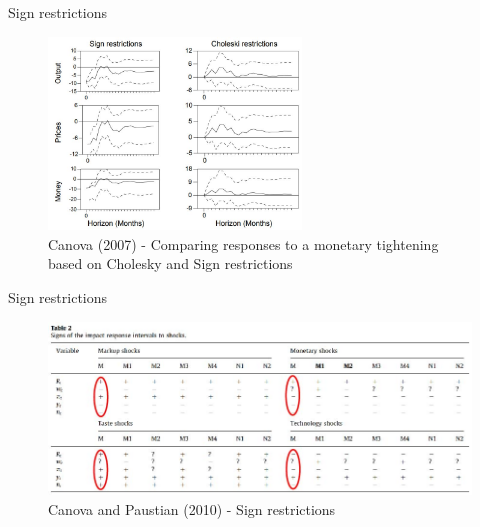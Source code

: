 
\begin{frame}{Sign restrictions}

\begin{figure}
\caption[Canov 2007]{Canova (2007) - Comparing responses to a monetary tightening based on Cholesky and Sign restrictions}
\centering
\label{fig:sign_vs_chol_irfs}
\includegraphics[width=0.60\textwidth]{Figures/sign_vs_chol_irfs.JPG}
\end{figure}

\end{frame}


\begin{frame}{Sign restrictions}

\begin{figure}
\caption[Canova and Paustian 2010]{Canova and Paustian (2010) - Sign restrictions}
\centering
\label{fig:sign_restrictions}
\includegraphics[width=1.0\textwidth]{Figures/sign_restrictions.JPG}
\end{figure}

\end{frame}

